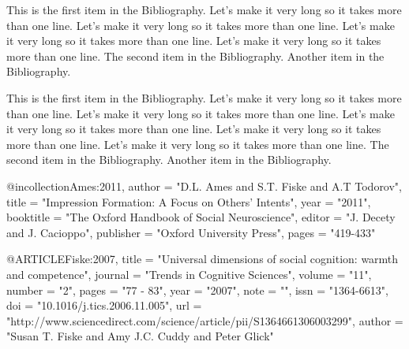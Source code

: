  
%
\begin{singlespace}
\begin{thebibliography}{99}
 This is the first item in the Bibliography.
Let's make it very long so it takes more than one line.
Let's make it very long so it takes more than one line.
Let's make it very long so it takes more than one line.
Let's make it very long so it takes more than one line. 
 The second item in the Bibliography.
 Another item in the Bibliography.
\end{thebibliography}
\end{singlespace}
   
%
\begin{singlespace}
\bibentry This is the first item in the Bibliography.
Let's make it very long so it takes more than one line.
Let's make it very long so it takes more than one line.
Let's make it very long so it takes more than one line.
Let's make it very long so it takes more than one line.
Let's make it very long so it takes more than one line. 
\bibentry The second item in the Bibliography.
\bibentry Another item in the Bibliography.
  
\end{singlespace} 


@incollection{Ames:2011,
author = "D.L. Ames and S.T. Fiske and A.T Todorov",
title = "Impression Formation: A Focus on Others’ Intents",
year = "2011",
booktitle = "The Oxford Handbook of Social Neuroscience",
editor = "J. Decety and J. Cacioppo",
publisher = "Oxford University Press",
pages = "419-433"
}

@ARTICLE{Fiske:2007,
title = "Universal dimensions of social cognition: warmth and competence",
journal = "Trends in Cognitive Sciences",
volume = "11",
number = "2",
pages = "77 - 83",
year = "2007",
note = "",
issn = "1364-6613",
doi = "10.1016/j.tics.2006.11.005",
url = "http://www.sciencedirect.com/science/article/pii/S1364661306003299",
author = "Susan T. Fiske and Amy J.C. Cuddy and Peter Glick"
}

